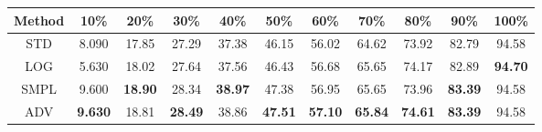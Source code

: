 \documentclass{standalone}
\begin{document}
\begin{tabular}{c|cccccccccc}
      \toprule
      Method & 10\% & 20\% & 30\% & 40\% & 50\% & 60\% & 70\% & 80\% & 90\% & 100\% \\
      \midrule
STD & 8.090 & 17.85 & 27.29 & 37.38 & 46.15 & 56.02 & 64.62 & 73.92 & 82.79 & 94.58\\
LOG & 5.630 & 18.02 & 27.64 & 37.56 & 46.43 & 56.68 & 65.65 & 74.17 & 82.89 & \textbf{94.70}\\
SMPL & 9.600 & \textbf{18.90} & 28.34 & \textbf{38.97} & 47.38 & 56.95 & 65.65 & 73.96 & \textbf{83.39} & 94.58\\
ADV & \textbf{9.630} & 18.81 & \textbf{28.49} & 38.86 & \textbf{47.51} & \textbf{57.10} & \textbf{65.84} & \textbf{74.61} & \textbf{83.39} & 94.58\\
  \bottomrule
\end{tabular}
\end{document}
